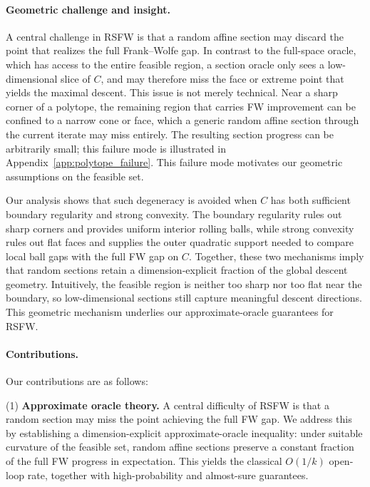 \documentclass{article}
\begin{document}
\paragraph{Geometric challenge and insight.}
A central challenge in RSFW is that a random affine section may discard the
point that realizes the full Frank--Wolfe gap. In contrast to the full-space
oracle, which has access to the entire feasible region, a section oracle only
sees a low-dimensional slice of $C$, and may therefore miss the face or extreme
point that yields the maximal descent.
This issue is not merely technical. Near a sharp corner of a polytope, the
remaining region that carries FW improvement can be confined to a narrow cone or
face, which a generic random affine section through the current iterate may miss
entirely. The resulting section progress can be arbitrarily small; this failure
mode is illustrated in Appendix~\ref{app:polytope_failure}. This failure mode motivates our geometric assumptions on the
feasible set.

Our analysis shows that such degeneracy is avoided when \(C\) has both
sufficient boundary regularity and strong convexity. The boundary regularity
rules out sharp corners and provides uniform interior rolling balls, while
strong convexity rules out flat faces and supplies the outer quadratic support
needed to compare local ball gaps with the full FW gap on \(C\). Together,
these two mechanisms imply that random sections retain a dimension-explicit
fraction of the global descent geometry. Intuitively, the feasible region is
neither too sharp nor too flat near the boundary, so low-dimensional sections
still capture meaningful descent directions. This geometric mechanism underlies
our approximate-oracle guarantees for RSFW. 
\paragraph{Contributions.}
Our contributions are as follows:

(1) \textbf{Approximate oracle theory.}
A central difficulty of RSFW is that a random section may miss the point
achieving the full FW gap. We address this by establishing a
dimension-explicit approximate-oracle inequality: under suitable curvature of
the feasible set, random affine sections preserve a constant fraction of the
full FW progress in expectation. This yields the classical \(O(1/k)\) open-loop rate,
together with high-probability and almost-sure guarantees.
\end{document}
